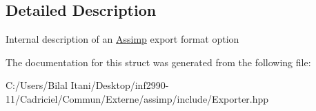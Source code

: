 \subsection{Detailed Description}
Internal description of an \hyperlink{namespace_assimp}{Assimp} export format option 

The documentation for this struct was generated from the following file\+:\begin{DoxyCompactItemize}
\item 
C\+:/\+Users/\+Bilal Itani/\+Desktop/inf2990-\/11/\+Cadriciel/\+Commun/\+Externe/assimp/include/Exporter.\+hpp\end{DoxyCompactItemize}

